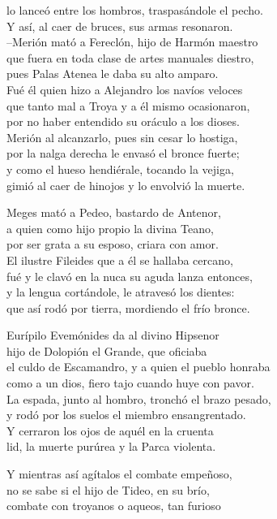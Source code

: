 \documentclass[11pt,twoside]{article}
\begin{document}
lo lanceó entre los hombros, traspasándole el pecho.\\
Y así, al caer de bruces, sus armas resonaron.\\
--Merión mató a Fereclón, hijo de Harmón maestro\\
que fuera en toda clase de artes manuales diestro,\\
pues Palas Atenea le daba su alto amparo.\\
Fué él quien hizo a Alejandro los navíos veloces\\
que tanto mal a Troya y a él mismo ocasionaron,\\
por no haber entendido su oráculo a los dioses.\\
Merión al alcanzarlo, pues sin cesar lo hostiga,\\
por la nalga derecha le envasó el bronce fuerte;\\
y como el hueso hendiérale, tocando la vejiga,\\
gimió al caer de hinojos y lo envolvió la muerte.\par
Meges mató a Pedeo, bastardo de Antenor,\\
a quien como hijo propio la divina Teano,\\
por ser grata a su esposo, criara con amor.\\
El ilustre Fileides que a él se hallaba cercano,\\
fué y le clavó en la nuca su aguda lanza entonces,\\
y la lengua cortándole, le atravesó los dientes:\\
que así rodó por tierra, mordiendo el frío bronce.\par
Eurípilo Evemónides da al divino Hipsenor\\
hijo de Dolopión el Grande, que oficiaba\\
el culdo de Escamandro, y a quien el pueblo honraba\\
como a un dios, fiero tajo cuando huye con pavor.\\
La espada, junto al hombro, tronchó el brazo pesado,\\
y rodó por los suelos el miembro ensangrentado.\\
Y cerraron los ojos de aquél en la cruenta\\
lid, la muerte purúrea y la Parca violenta.\par
Y mientras así agítalos el combate empeñoso,\\
no se sabe si el hijo de Tideo, en su brío,\\
combate con troyanos o aqueos, tan furioso\\
\end{document}
